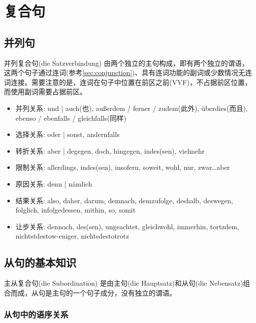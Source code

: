 \section{复合句}

\subsection{并列句}
并列复合句(die Satzverbindung) 由两个独立的主句构成，即有两个独立的谓语，这两个句子通过连词(参考\cref{sec:conjunction})、具有连词功能的副词或少数情况无连词连接。需要注意的是，连词在句子中位置在前区之前(VVF)，不占据前区位置，而使用副词需要占据前区。

\begin{itemize}
    \item 并列关系: und | auch(也), außerdem / ferner / zudem(此外), überdies(而且), ebenso / ebenfalls / gleichfalls(同样)

    \item 选择关系: oder | sonst, andernfalls

    \item 转折关系: aber | degegen, doch, hingegen, indes(sen), vielmehr

    \item 限制关系: allerdings, indes(sen), insofern, soweit, wohl, nur, zwar\ldots aber

    \item 原因关系: denn | nämlich

    \item 结果关系: also, daher, darum, demnach, demzufolge, deshalb, deswegen, folglich, infolgedessen, mithin, so, somit

    \item 让步关系: dennoch, des(sen), ungeachtet, gleichwohl, immerhin, tortzdem, nichtstdestow-eniger, nichtsdestotrotz
\end{itemize}

\subsection{从句的基本知识}

主从复合句(die Subordination) 是由主句(die Hauptsatz)和从句(die Nebensatz)组合而成，从句是主句的一个句子成分，没有独立的谓语。

\subsubsection{从句中的语序关系}

